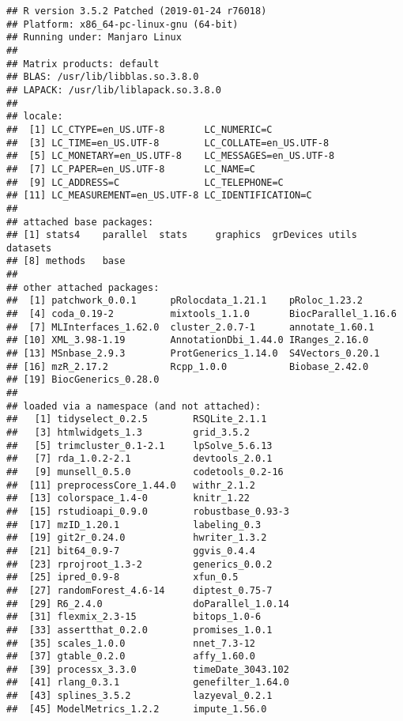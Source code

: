 \documentclass[9pt,a4paper,]{extarticle}
\begin{document}
\begin{verbatim}
## R version 3.5.2 Patched (2019-01-24 r76018)
## Platform: x86_64-pc-linux-gnu (64-bit)
## Running under: Manjaro Linux
## 
## Matrix products: default
## BLAS: /usr/lib/libblas.so.3.8.0
## LAPACK: /usr/lib/liblapack.so.3.8.0
## 
## locale:
##  [1] LC_CTYPE=en_US.UTF-8       LC_NUMERIC=C              
##  [3] LC_TIME=en_US.UTF-8        LC_COLLATE=en_US.UTF-8    
##  [5] LC_MONETARY=en_US.UTF-8    LC_MESSAGES=en_US.UTF-8   
##  [7] LC_PAPER=en_US.UTF-8       LC_NAME=C                 
##  [9] LC_ADDRESS=C               LC_TELEPHONE=C            
## [11] LC_MEASUREMENT=en_US.UTF-8 LC_IDENTIFICATION=C       
## 
## attached base packages:
## [1] stats4    parallel  stats     graphics  grDevices utils     datasets 
## [8] methods   base     
## 
## other attached packages:
##  [1] patchwork_0.0.1      pRolocdata_1.21.1    pRoloc_1.23.2       
##  [4] coda_0.19-2          mixtools_1.1.0       BiocParallel_1.16.6 
##  [7] MLInterfaces_1.62.0  cluster_2.0.7-1      annotate_1.60.1     
## [10] XML_3.98-1.19        AnnotationDbi_1.44.0 IRanges_2.16.0      
## [13] MSnbase_2.9.3        ProtGenerics_1.14.0  S4Vectors_0.20.1    
## [16] mzR_2.17.2           Rcpp_1.0.0           Biobase_2.42.0      
## [19] BiocGenerics_0.28.0 
## 
## loaded via a namespace (and not attached):
##   [1] tidyselect_0.2.5        RSQLite_2.1.1          
##   [3] htmlwidgets_1.3         grid_3.5.2             
##   [5] trimcluster_0.1-2.1     lpSolve_5.6.13         
##   [7] rda_1.0.2-2.1           devtools_2.0.1         
##   [9] munsell_0.5.0           codetools_0.2-16       
##  [11] preprocessCore_1.44.0   withr_2.1.2            
##  [13] colorspace_1.4-0        knitr_1.22             
##  [15] rstudioapi_0.9.0        robustbase_0.93-3      
##  [17] mzID_1.20.1             labeling_0.3           
##  [19] git2r_0.24.0            hwriter_1.3.2          
##  [21] bit64_0.9-7             ggvis_0.4.4            
##  [23] rprojroot_1.3-2         generics_0.0.2         
##  [25] ipred_0.9-8             xfun_0.5               
##  [27] randomForest_4.6-14     diptest_0.75-7         
##  [29] R6_2.4.0                doParallel_1.0.14      
##  [31] flexmix_2.3-15          bitops_1.0-6           
##  [33] assertthat_0.2.0        promises_1.0.1         
##  [35] scales_1.0.0            nnet_7.3-12            
##  [37] gtable_0.2.0            affy_1.60.0            
##  [39] processx_3.3.0          timeDate_3043.102      
##  [41] rlang_0.3.1             genefilter_1.64.0      
##  [43] splines_3.5.2           lazyeval_0.2.1         
##  [45] ModelMetrics_1.2.2      impute_1.56.0          

\end{verbatim}
\end{document}
